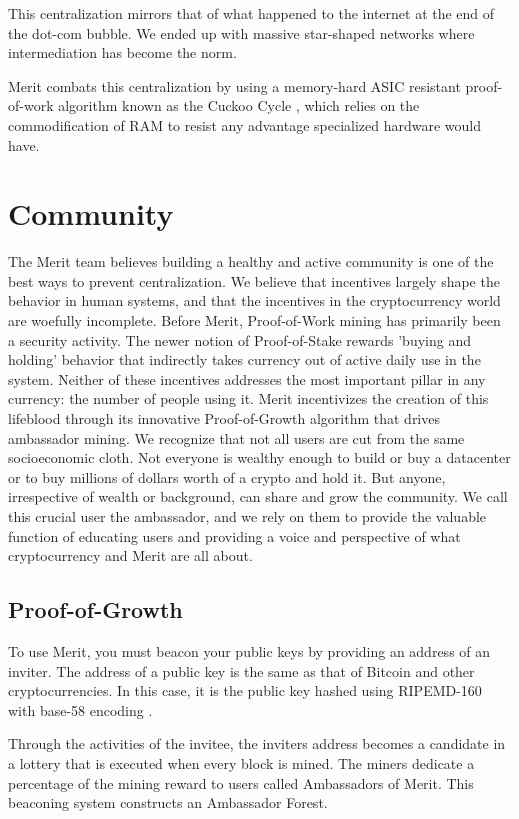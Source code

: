 \documentclass{article}
\begin{document}
This centralization mirrors that of what happened to the internet at the end of
the dot-com bubble. We ended up with massive star-shaped networks where 
intermediation has become the norm.

Merit combats this centralization by using a memory-hard ASIC resistant
proof-of-work algorithm known as the Cuckoo Cycle \cite{cuckoo}, which relies
on the commodification of RAM to resist any advantage specialized hardware would
have.

\section{Community}

The Merit team believes building a healthy and active community is one of the best ways to
prevent centralization. We believe that incentives largely shape the behavior in human systems, 
and that the incentives in the cryptocurrency world are woefully incomplete.  Before Merit, Proof-of-Work mining has primarily 
been a security activity.  The newer notion of Proof-of-Stake rewards 'buying and holding' behavior that indirectly takes 
currency out of active daily use in the system.  Neither of these incentives addresses the most important pillar in 
any currency: the number of people using it.  Merit incentivizes the creation of this lifeblood through its innovative Proof-of-Growth algorithm 
that drives ambassador mining.  We recognize that not all users are cut from the same socioeconomic cloth.  
Not everyone is wealthy enough to build or buy a datacenter or to buy millions of dollars worth of a crypto and hold it.  
But anyone, irrespective of wealth or background, can share and grow the community. We call this crucial user the ambassador, and we rely on them 
to provide the valuable function
of educating users and providing a voice and perspective of what cryptocurrency and Merit are all about. 

\subsection{Proof-of-Growth}

To use Merit, you must \gls{beacon} your \glspl{public key} by providing an address of an inviter.
The address of a public key is the same as that of Bitcoin and other cryptocurrencies.
In this case, it is the public key hashed using RIPEMD-160 with base-58 encoding
\cite{ripemd}.

Through the activities of the invitee, the inviters address becomes a candidate in a lottery
that is executed when every block is mined. The miners dedicate a percentage of the mining
reward to users called Ambassadors of Merit. This beaconing system constructs
an Ambassador Forest.
\end{document}
